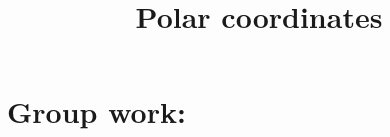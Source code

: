 \documentclass[]{ximera}
\title{Polar coordinates}
\begin{document}
\begin{abstract}		\end{abstract}
\maketitle



\begin{comment}
\section{Warm up:}

	\begin{freeResponse}
	
	\end{freeResponse}
	
\begin{instructorNotes}

\end{instructorNotes}
\end{comment}







\section{Group work:}
\end{document}
